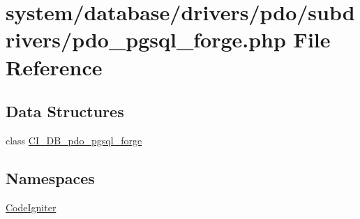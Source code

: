 \hypertarget{pdo__pgsql__forge_8php}{}\section{system/database/drivers/pdo/subdrivers/pdo\+\_\+pgsql\+\_\+forge.php File Reference}
\label{pdo__pgsql__forge_8php}
\subsection*{Data Structures}
\begin{DoxyCompactItemize}
\item 
class \mbox{\hyperlink{class_c_i___d_b__pdo__pgsql__forge}{C\+I\+\_\+\+D\+B\+\_\+pdo\+\_\+pgsql\+\_\+forge}}
\end{DoxyCompactItemize}
\subsection*{Namespaces}
\begin{DoxyCompactItemize}
\item 
 \mbox{\hyperlink{namespace_code_igniter}{Code\+Igniter}}
\end{DoxyCompactItemize}
